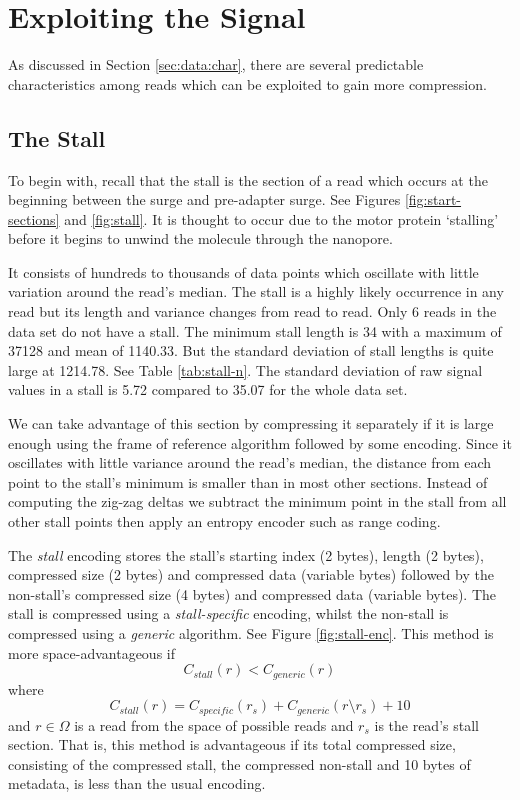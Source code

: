 \section{Exploiting the Signal}

As discussed in Section
\ref{sec:data:char},
there are several predictable characteristics among reads which can be exploited
to gain more compression.

\subsection{The Stall}

To begin with, recall that the stall is the section of a read which occurs at
the beginning between the surge and pre-adapter surge. See Figures
\ref{fig:start-sections} and \ref{fig:stall}. It is thought to occur due to the
motor protein `stalling' before it begins to unwind the molecule through the
nanopore.



It consists of hundreds to thousands of data points which oscillate with little
variation around the read's median. The stall is a highly likely occurrence in
any read but its length and variance changes from read to read.  Only 6 reads in
the data set do not have a stall. The minimum stall length is 34 with a maximum
of \num{37128} and mean of 1140.33. But the standard deviation of stall lengths
is quite large at 1214.78. See Table \ref{tab:stall-n}. The standard deviation
of raw signal values in a stall is 5.72 compared to 35.07 for the whole data
set.



We can take advantage of this section by compressing it separately if it is
large enough using the frame of reference algorithm followed by some encoding.
Since it oscillates with little variance around the read's median, the distance
from each point to the stall's minimum is smaller than in most other sections.
Instead of computing the zig-zag deltas we subtract the minimum point in the
stall from all other stall points then apply an entropy encoder such as
range coding.

The \textit{stall} encoding stores the stall's starting index (2 bytes), length
(2 bytes), compressed size (2 bytes) and compressed data (variable bytes)
followed by the non-stall's compressed size (4 bytes) and compressed data
(variable bytes). The stall is compressed using a \textit{stall-specific}
encoding, whilst the non-stall is compressed using a \textit{generic} algorithm.
See Figure \ref{fig:stall-enc}.
This method is more space-advantageous if
\[ C_{stall}(r) < C_{generic}(r) \]
where
\[ C_{stall}(r) = C_{specific}(r_s) + C_{generic}(r\setminus r_s) + 10 \]
and $r\in\Omega$ is a read from the space of possible reads and $r_s$ is the
read's stall section. That is, this method is advantageous if its total
compressed size, consisting of the compressed stall, the compressed non-stall
and 10 bytes of metadata, is less than the usual encoding.


